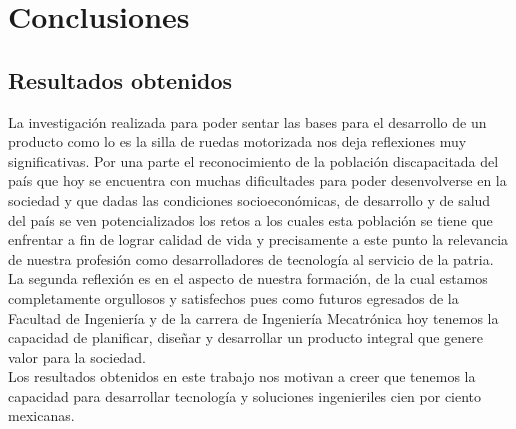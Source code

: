 
\chapter{Conclusiones} %

\label{Chapter5} %




\section{Resultados obtenidos}
La investigaci\'on realizada para poder sentar las bases para el desarrollo de un producto como lo es la silla de ruedas motorizada nos deja reflexiones muy significativas. Por una parte el reconocimiento de la poblaci\'on discapacitada del pa\'is que hoy se encuentra con muchas dificultades para poder desenvolverse en la sociedad y que dadas las condiciones socioecon\'omicas, de desarrollo y de salud del pa\'is se ven potencializados los retos a los cuales esta poblaci\'on se tiene que enfrentar a fin de lograr calidad de vida y precisamente a este punto la relevancia de nuestra profesi\'on como desarrolladores de tecnolog\'ia al servicio de la patria.\\
La segunda reflexi\'on es en el aspecto de nuestra formaci\'on, de la cual estamos completamente orgullosos y satisfechos pues como futuros egresados de la Facultad de Ingenier\'ia y de la carrera de Ingenier\'ia Mecatr\'onica hoy tenemos la capacidad de planificar, diseñar y desarrollar un producto integral que genere valor para la sociedad.\\
Los resultados obtenidos en este trabajo nos motivan a creer que tenemos la capacidad para desarrollar tecnolog\'ia y soluciones ingenieriles cien por ciento mexicanas.
